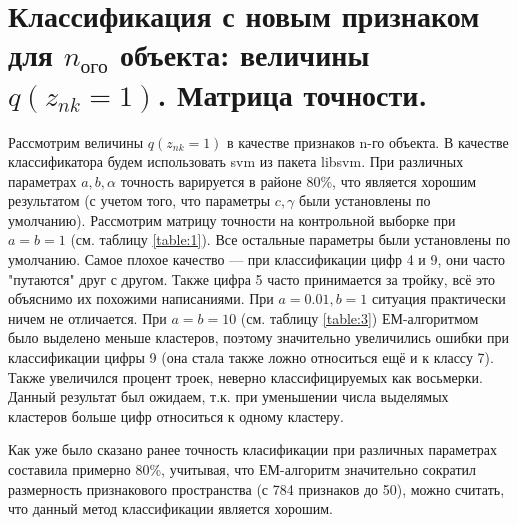 \documentclass[twoside]{article}
\begin{document}
\section{Классификация с новым признаком для $n_\text{ого}$ объекта: величины $q(z_{nk} = 1)$. Матрица точности.}


Рассмотрим величины $q(z_{nk} = 1)$ в качестве признаков n-го объекта. В качестве классификатора будем использовать svm из пакета libsvm. При различных параметрах $a, b, \alpha$ точность варируется в районе 80\%, что является хорошим результатом (с учетом того, что параметры $c, \gamma$ были установлены по умолчанию). Рассмотрим матрицу точности на контрольной выборке при $a = b = 1$ (см. таблицу \ref{table:1}). Все остальные параметры были установлены по умолчанию. Самое плохое качество  --- при классификации цифр 4 и 9, они часто "путаются" друг с другом. Также цифра 5 часто принимается за тройку, всё это объяснимо их похожими написаниями.  При $a = 0.01, b = 1$ ситуация практически ничем не отличается. При $a = b = 10$ (см. таблицу \ref{table:3}) ЕМ-алгоритмом было выделено меньше кластеров, поэтому значительно увеличились ошибки при классификации цифры 9 (она стала также ложно относиться ещё и к классу 7). Также увеличился процент троек, неверно классифицируемых как восьмерки. Данный результат был ожидаем, т.к. при уменьшении числа выделямых кластеров  больше цифр относиться к одному кластеру.   

Как уже было сказано ранее точность класификации при различных параметрах составила примерно 80\%, учитывая, что ЕМ-алгоритм значительно сократил размерность признакового пространства (с 784 признаков до 50), можно считать, что данный метод классификации является хорошим.
\end{document}
